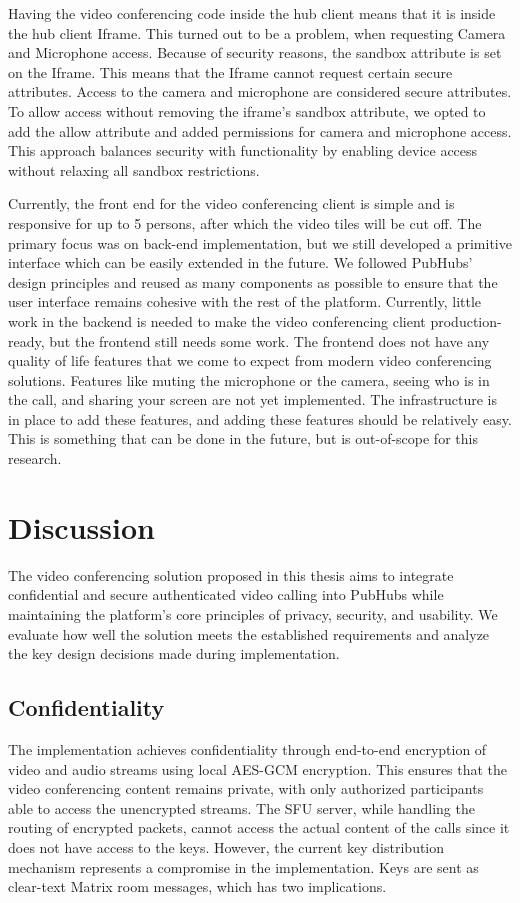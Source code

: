 \documentclass{report}
\begin{document}
Having the video conferencing code inside the hub client means that it is inside the hub client Iframe.
This turned out to be a problem, when requesting Camera and Microphone access. Because of security reasons, the
sandbox attribute is set on the Iframe. This means that the Iframe cannot request certain secure attributes.
Access to the camera and microphone are considered secure attributes.
To allow access without removing the iframe’s sandbox attribute, we opted to add the allow attribute and added
permissions for camera and microphone access.
This approach balances security with functionality by enabling device access without relaxing all sandbox restrictions.

Currently, the front end for the video conferencing client is simple and is responsive for up to 5 persons, after which
the video tiles will be cut off.
The primary focus was on back-end implementation, but we still developed a primitive interface which can be easily
extended in the future.
We followed PubHubs’ design principles and reused as many components as possible to ensure that the user interface
remains cohesive with the rest of the platform. Currently, little work in the backend is needed to make the video
conferencing client production-ready, but the frontend still needs some work. The frontend does not have any quality
of life features that we come to expect from modern video conferencing solutions. Features like muting the
microphone or the camera, seeing who is in the call, and sharing your screen are not yet implemented. The
infrastructure is in place to add these features, and adding these features should be relatively easy. This is
something that can be done in the future, but is out-of-scope for this research.

\chapter{Discussion}
The video conferencing solution proposed in this thesis aims to integrate confidential and secure authenticated video
calling into PubHubs while maintaining the platform's core principles of privacy, security, and usability. We evaluate
how well the solution meets the established requirements and analyze the key design decisions made during
implementation.

\section{Confidentiality}
The implementation achieves confidentiality through end-to-end encryption of video and audio streams using local
AES-GCM encryption. This ensures that the video conferencing content remains private, with only authorized
participants able to access the unencrypted streams. The SFU server, while handling the routing of encrypted
packets, cannot access the actual content of the calls since it does not have access to the keys. However, the current
key distribution mechanism represents a compromise in the implementation. Keys are sent as
clear-text Matrix room messages, which has two implications.
\end{document}

